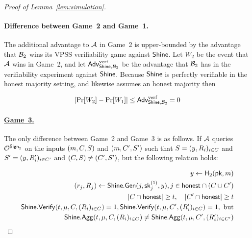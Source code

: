 \begin{proof}[Proof of Lemma~\ref{lem:simulation}]
  \paragraph{Difference between Game~2 and Game~1.}
  The additional advantage to $\mathcal{A}$ in Game~2 is upper-bounded by the
  advantage that $\mathcal{B}_2$ wins its VPSS verifiability game against $\mathsf{Shine}$.
  Let $W_2$ be the event that $\mathcal{A}$ wins in Game~2,
  and let $\textsf{\upshape Adv}^{\textrm{\upshape verf}}_{\mathsf{Shine},\mathcal{B}_2}$ be the advantage that $\mathcal{B}_2$ has in the verifiability experiment against $\mathsf{Shine}$.
  Because $\mathsf{Shine}$ is perfectly verifiable in the honest majority setting,
  and \glitter likewise assumes an honest majority
  then

  \begin{equation} \label{eq:game2}
  \lvert \Pr[W_2] - \Pr[W_1] \rvert \leq  \textsf{\upshape Adv}^{\textrm{\upshape verf}}_{\mathsf{Shine},\mathcal{B}_2} = 0
  \end{equation}


  \paragraph{\underline{Game~3.}}
  The only difference between Game~2 and Game~3 is as follows.
  If $\mathcal{A}$ queries $\mathcal{O}^{\mathsf{Sign}_2}$ on  the inputs
  $(m, C, S)$ and
  $(m, C', S')$
  such that
  $S = (y, R_i)_{i \in C}$ and
  $S' = (y, R_i')_{i \in C'}$ and
  $(C, S) \neq (C', S')$,
  but the following relation holds:

  \begin{align} \label{eq:game-2-rel}
    \begin{split}
      y \gets \mathsf{H}_2(\mathsf{pk},m) \\
      (r_j, R_j) \gets \mathsf{Shine}.\mathsf{Gen}(j, \mathsf{sk}^{(1)}_j, y), j \in \mathsf{honest} \cap (C \cup C') \\
      \lvert C \cap \mathsf{honest} \rvert \geq t, \quad \lvert C' \cap \mathsf{honest} \rvert \geq t \\
      \mathsf{Shine}.\mathsf{Verify}(t, \mu, C, (R_i)_{i \in C} ) = 1,
      \mathsf{Shine}.\mathsf{Verify}(t, \mu, C', (R_i')_{i \in C}) = 1, \text{ but} \\
      \mathsf{Shine}.\mathsf{Agg}(t, \mu, C, (R_i)_{i \in C}) \neq
      \mathsf{Shine}.\mathsf{Agg}(t, \mu, C', (R_i')_{i \in C'})
    \end{split}
  \end{align}


\end{proof}
